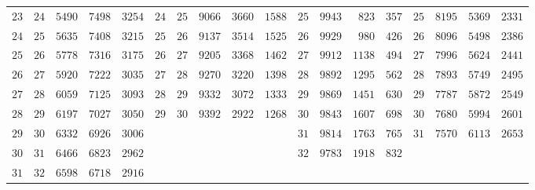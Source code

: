 \begin{center}
{{\begin{minipage}{.96\linewidth}
\begin{tabular}{r|r|r|r|r||r|r|r|r|r||r|r|r|r||r|r|r|r}
$23$ & $24$ & $5490$ & $7498$ & $3254$ & $24$ & $25$ & $9066$ & $3660$ & $1588$ & $25$ & $9943$ & $823$ & $357$ & $25$ & $8195$ & $5369$ & $2331$\\[3pt]
$24$ & $25$ & $5635$ & $7408$ & $3215$ & $25$ & $26$ & $9137$ & $3514$ & $1525$ & $26$ & $9929$ & $980$ & $426$ & $26$ & $8096$ & $5498$ & $2386$\\
$25$ & $26$ & $5778$ & $7316$ & $3175$ & $26$ & $27$ & $9205$ & $3368$ & $1462$ & $27$ & $9912$ & $1138$ & $494$ & $27$ & $7996$ & $5624$ & $2441$\\
$26$ & $27$ & $5920$ & $7222$ & $3035$ & $27$ & $28$ & $9270$ & $3220$ & $1398$ & $28$ & $9892$ & $1295$ & $562$ & $28$ & $7893$ & $5749$ & $2495$\\
$27$ & $28$ & $6059$ & $7125$ & $3093$ & $28$ & $29$ & $9332$ & $3072$ & $1333$ & $29$ & $9869$ & $1451$ & $630$ & $29$ & $7787$ & $5872$ & $2549$\\
$28$ & $29$ & $6197$ & $7027$ & $3050$ & $29$ & $30$ & $9392$ & $2922$ & $1268$ & $30$ & $9843$ & $1607$ & $698$ & $30$ & $7680$ & $5994$ & $2601$\\[3pt]
$29$ & $30$ & $6332$ & $6926$ & $3006$ &  &  &  &  &  & $31$ & $9814$ & $1763$ & $765$ & $31$ & $7570$ & $6113$ & $2653$\\
$30$ & $31$ & $6466$ & $6823$ & $2962$ &  &  &  &  &  & $32$ & $9783$ & $1918$ & $832$ &  &  &  & \\
$31$ & $32$ & $6598$ & $6718$ & $2916$ &  &  &  &  &  &  &  &  &  &  &  &  & \\
\end{tabular}\endgroup
\end{minipage}}}\endgroup
\end{center}
\clearpage
{}%
